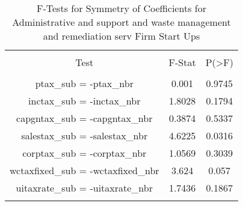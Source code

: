 
\begin{table}[!htbp] \centering 
  \caption{F-Tests for Symmetry of Coefficients for Administrative and support and waste management and remediation serv Firm Start Ups} 
  \label{56Ftests} 
\begin{tabular}{@{\extracolsep{5pt}} ccc} 
\\[-1.8ex]\hline 
\hline \\[-1.8ex] 
Test & F-Stat & P(\textgreater F) \\ 
\hline \\[-1.8ex] 
ptax\_sub = -ptax\_nbr & 0.001 & 0.9745 \\ 
inctax\_sub = -inctax\_nbr & 1.8028 & 0.1794 \\ 
capgntax\_sub = -capgntax\_nbr & 0.3874 & 0.5337 \\ 
salestax\_sub = -salestax\_nbr & 4.6225 & 0.0316 \\ 
corptax\_sub = -corptax\_nbr & 1.0569 & 0.3039 \\ 
wctaxfixed\_sub = -wctaxfixed\_nbr & 3.624 & 0.057 \\ 
uitaxrate\_sub = -uitaxrate\_nbr & 1.7436 & 0.1867 \\ 
\hline \\[-1.8ex] 
\end{tabular} 
\end{table} 
